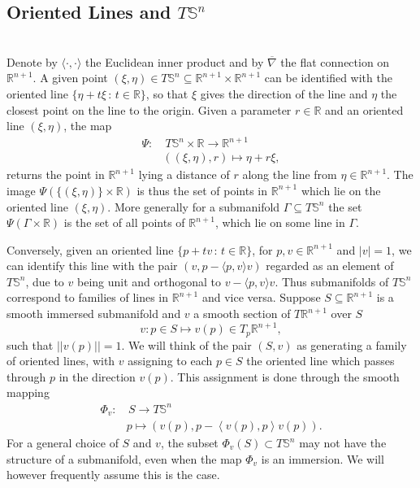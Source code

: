 \documentclass[12pt]{amsart}
\theoremstyle{plain}
\theoremstyle{definition}
\def\R{\mathbb{R}}
\def\S{\mathbb{S}}
\numberwithin{equation}{section}
\begin{document}
 \subsection{Oriented Lines and \texorpdfstring{$T\S^n$}{TSn}}\hfill \\
 Denote by $\langle \cdot, \cdot \rangle$ the Euclidean inner product and by $\overline{\nabla}$ the flat connection on $\mathbb{R}^{n+1}$. A given point $(\xi,\eta)\in T\S^n\subseteq\R^{n+1}\times \R^{n+1}$ can be identified with the oriented line $\{\eta+t\xi\,:\, t\in {\mathbb R}\}$, so that $\xi$ gives the direction of the line and $\eta$ the closest point on the line to the origin. Given a parameter $r\in \mathbb{R}$ and an oriented line $(\xi,\eta)$, the map
 \begin{equation}\label{eq:definition_of_psi}
\begin{aligned}
    \Psi:&~T\mathbb{S}^n\times \mathbb{R}\to\mathbb{R}^{n+1}\\
    &((\xi, \eta),r) \longmapsto \eta+r\xi,
\end{aligned}
\end{equation}
returns the point in $\mathbb{R}^{n+1}$ lying a distance of $r$ along the line from $\eta\in\mathbb{R}^{n+1}$. The image $\Psi(\{(\xi,\eta)\}\times\mathbb{R})$ is thus the set of points in $\mathbb{R}^{n+1}$ which lie on the oriented line $(\xi,\eta)$. More generally for a submanifold $\Gamma\subseteq T\mathbb{S}^n$ the set $\Psi(\Gamma\times \mathbb{R})$ is the set of all points of $\mathbb{R}^{n+1}$, which lie on some line in $\Gamma$.

Conversely, given an  oriented line $\{p+tv\,:\, t\in {\mathbb R}\}$, for $p,v\in \mathbb{R}^{n+1}$ and $|v|=1${,} we can identify this line with the pair $(v,p-\langle p,v\rangle v)$ regarded as an element of $T\S^n$, due to $v$ being unit and orthogonal to $v-\langle p, v\rangle v$. Thus submanifolds of $T\S^n$ correspond to families of lines in $\mathbb{R}^{n+1}$ and vice versa. Suppose  $S\subseteq\mathbb{R}^{n+1}$ is a smooth immersed submanifold and $v$ a smooth section of $T\mathbb{R}^{n+1}$ over $S$
\[
v: p\in S \longmapsto v(p) \in T_p\mathbb{R}^{n+1},
\]
such that $||v(p)||=1$. We will think of the pair $(S,v)$ as generating a family of oriented lines, with $v$ assigning to each $p\in S$ the oriented line which passes through $p$ in the direction $v(p)$. This assignment is done through the smooth mapping
\begin{equation}\label{equ: definition of Phi}
\begin{aligned}
\Phi_v:&\,S\rightarrow T{\mathbb S}^n  \\
&p\longmapsto (v(p),p-\left<v(p),p\right>v(p)).
\end{aligned}
\end{equation}
For a general choice of $S$ and $v$, the subset $\Phi_v(S)\subset T\S^n$ may not have the structure of a submanifold, even when the map $\Phi_v$ is an immersion. We will however frequently assume this is the case. 
\end{document}
